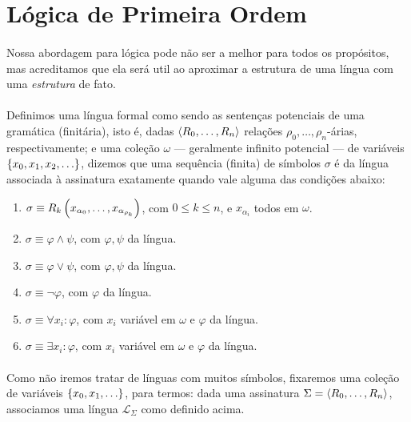     \section{Lógica de Primeira Ordem}
        \paragraph{}
            Nossa abordagem para lógica pode não ser
            a melhor para todos os propósitos, mas 
            acreditamos que ela será util ao aproximar
            a estrutura de uma língua com uma 
            {\em estrutura} de fato.
        \paragraph{}
            Definimos uma língua formal como sendo 
            as sentenças potenciais de uma gramática
            (finitária), isto é, dadas $\TUPLE{R_0}{\ldots}{R_n}$
            relações $\rho_0,\ldots,\rho_n$-árias,
            respectivamente; e uma coleção $\omega$ --- geralmente
            infinito potencial --- de variáveis 
            $\SET{x_0}{x_1}{x_2}{\ldots}$, dizemos 
            que uma sequência (finita) de símbolos $\sigma$ é 
            da língua associada à assinatura 
            exatamente quando vale alguma das 
            condições abaixo:
        \begin{enumerate}[label=\alph*)]
            \item $\sigma\equiv R_k\POINT{x_{\alpha_0}}{\ldots}{x_{\alpha_{\rho_k}}}$, com $0\leq k\leq n$, e $x_{\alpha_i}$ todos em $\omega$.
            \item $\sigma\equiv \varphi\land\psi$, com $\varphi,\psi$ da língua.
            \item $\sigma\equiv \varphi\lor \psi$, com $\varphi,\psi$ da língua.
            \item $\sigma\equiv \neg\varphi$, com $\varphi$ da língua.
            \item $\sigma\equiv \forall x_i:\varphi$, com $x_i$ variável em $\omega$ e $\varphi$ da língua.
            \item $\sigma\equiv \exists x_i:\varphi$, com $x_i$ variável em $\omega$ e $\varphi$ da língua.
        \end{enumerate}
        \paragraph{}
            Como não iremos tratar de línguas com 
            muitos símbolos, fixaremos uma coleção
            de variáveis $\SET{x_0}{x_1}{\ldots}$,
            para termos: dada uma assinatura $\Sigma=
            \TUPLE{R_0}{\ldots}{R_n}$, associamos 
            uma língua $\mathcal{L}_\Sigma$ como 
            definido acima.
        
